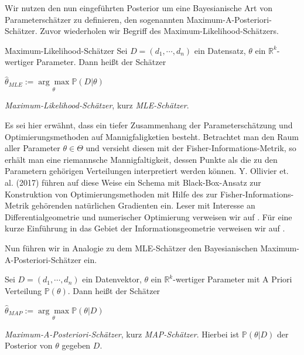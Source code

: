 

Wir nutzen den nun eingeführten Posterior um eine Bayesianische Art von Parameterschätzer zu definieren, den sogenannten Maximum-A-Posteriori-Schätzer. Zuvor wiederholen wir Begriff des Maximum-Likelihood-Schätzers.

\begin{defi}{Maximum-Likelihood-Schätzer}
	Sei $D = (d_1, \cdots, d_n)$ ein Datensatz, $\theta$ ein $\mathbb{R}^k$-wertiger 
	Parameter. Dann heißt der Schätzer
	\begin{center}
		$\hat{\theta}_{MLE} := \underset{\theta}{\arg \max} \mathbb{P}(D \vert \theta)$
	\end{center}
	\textit{Maximum-Likelihood-Schätzer}, kurz \textit{MLE-Schätzer}.
\end{defi}

Es sei hier erwähnt, dass ein tiefer Zusammenhang der Parameterschätzung und Optimierungsmethoden auf Mannigfaligketien besteht. Betrachtet man den Raum aller Parameter $\theta \in \Theta$ und versieht diesen mit der Fisher-Informations-Metrik, so erhält man eine riemannsche Mannigfaltigkeit, dessen Punkte als die zu den Parametern gehörigen Verteilungen interpretiert werden können. Y. Ollivier et. al. (2017) führen auf diese Weise ein Schema mit Black-Box-Ansatz zur Konstruktion von Optimierungsmethoden mit Hilfe des zur Fisher-Informations-Metrik gehörenden natürlichen Gradienten ein. Leser mit Interesse an Differentialgeometrie und numerischer Optimierung verweisen wir auf \cite{Info_Geom}. Für eine kurze Einführung in das Gebiet der Informationsgeometrie verweisen wir auf \cite{Info_Geom_intro}.

Nun führen wir in Analogie zu dem MLE-Schätzer den Bayesianischen Maximum-A-Posteriori-Schätzer ein.

\begin{defi}
	Sei $D = (d_1, \cdots, d_n)$ ein Datenvektor, $\theta$ ein $\mathbb{R}^k$-wertiger
	Parameter mit A Priori Verteilung $\mathbb{P}(\theta)$. Dann heißt der Schätzer
	\begin{center}
		$\hat{\theta}_{MAP} := \underset{\theta}{\arg \max} \mathbb{P}(\theta \vert 					D)$
	\end{center}
	\textit{Maximum-A-Posteriori-Schätzer}, kurz \textit{MAP-Schätzer}. Hierbei ist 
	$\mathbb{P}(\theta \vert D)$ der Posterior von $\theta$ gegeben $D$.
\end{defi}

